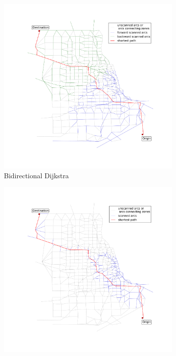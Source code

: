\begin{figure}
\begin{subfigure}{.5\textwidth}
        \includegraphics[width=\textwidth,trim=120px 120px 48px 120px,clip]{img/chicago_bidirect}
        \caption{Bidirectional Dijkstra}
        \label{fig:chicago_bidirect}
    \end{subfigure}
    \begin{subfigure}{.5\textwidth}
        \centering
        \includegraphics[width=\textwidth,trim=120px 120px 48px 0px,clip]{img/chicago_astar}

\end{subfigure}
\end{figure}
